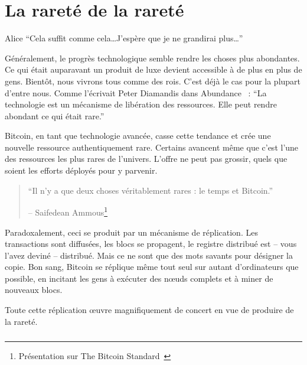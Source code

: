 
\chapter{La rareté de la rareté}
\label{les:2}

\begin{chapquote}{Alice}
\enquote{Cela suffit comme cela\ldots J’espère que je ne grandirai plus\ldots}
\end{chapquote}

Généralement, le progrès technologique semble rendre les choses plus abondantes.
Ce qui était auparavant un produit de luxe devient accessible à de plus en plus
de gens. Bientôt, nous vivrons tous comme des rois. C'est déjà le cas pour la
plupart d'entre nous. Comme l'écrivait Peter Diamandis dans
Abundance~\cite{abundance} : \enquote{La technologie est un mécanisme de
libération des ressources. Elle peut rendre abondant ce qui était rare.}

Bitcoin, en tant que technologie avancée, casse cette tendance et crée une
nouvelle ressource authentiquement rare. Certains avancent même que c'est l'une
des ressources les plus rares de l'univers. L'offre ne peut pas grossir, quels
que soient les efforts déployés pour y parvenir.

\begin{quotation}\begin{samepage}
\enquote{Il n'y a que deux choses véritablement rares : le temps et Bitcoin.}
\begin{flushright} -- Saifedean Ammous\footnote{Présentation sur The Bitcoin
Standard~\cite{bitcoinstandard-pres}}
\end{flushright}\end{samepage}\end{quotation}

Paradoxalement, ceci se produit par un mécanisme de réplication. Les
transactions sont diffusées, les blocs se propagent, le registre distribué est
-- vous l'avez deviné -- distribué. Mais ce ne sont que des mots savants pour
désigner la copie. Bon sang, Bitcoin se réplique même tout seul sur autant
d'ordinateurs que possible, en incitant les gens à exécuter des nœuds complets
et à miner de nouveaux blocs.

Toute cette réplication œuvre magnifiquement de concert en vue de produire de la
rareté.

\paragraph{}


